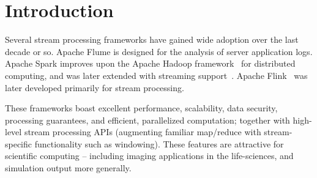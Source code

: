 \documentclass[conference]{IEEEtran}
\begin{document}
\section{Introduction}\label{intro}




Several stream processing frameworks have gained wide adoption over the last decade or so.
Apache Flume is designed for the analysis of server application logs. Apache Spark improves upon the Apache Hadoop framework~\cite{ApacheHadoop2011} for distributed computing, and was later extended with streaming support~\cite{zahariaApacheSparkUnified2016}. Apache Flink~\cite{carboneApacheFlinkStream2015} was later developed primarily for stream processing.


These frameworks boast 
excellent performance, scalability, data security, processing guarantees, and efficient, parallelized computation; together with high-level stream processing APIs (augmenting familiar map/reduce with stream-specific functionality such as windowing). These features are attractive for scientific computing -- including imaging applications in the life-sciences, and simulation output more generally.


\end{document}
